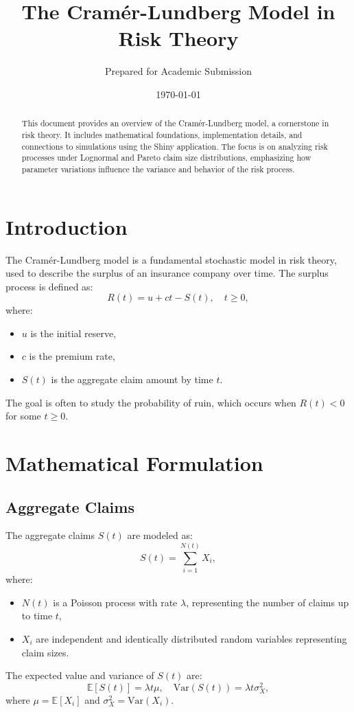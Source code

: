 \documentclass[12pt]{article}
\title{The Cram\'er-Lundberg Model in Risk Theory}
\author{Prepared for Academic Submission}
\date{\today}
\begin{document}
	
	\maketitle
	
	\begin{abstract}
		This document provides an overview of the Cram\'er-Lundberg model, a cornerstone in risk theory. It includes mathematical foundations, implementation details, and connections to simulations using the Shiny application. The focus is on analyzing risk processes under Lognormal and Pareto claim size distributions, emphasizing how parameter variations influence the variance and behavior of the risk process.
	\end{abstract}
	
	\section{Introduction}
	The Cram\'er-Lundberg model is a fundamental stochastic model in risk theory, used to describe the surplus of an insurance company over time. The surplus process is defined as:
	\[
	R(t) = u + ct - S(t), \quad t \geq 0,
	\]
	where:
	\begin{itemize}
		\item $u$ is the initial reserve,
		\item $c$ is the premium rate,
		\item $S(t)$ is the aggregate claim amount by time $t$.
	\end{itemize}
	The goal is often to study the probability of ruin, which occurs when $R(t) < 0$ for some $t \geq 0$.
	
	\section{Mathematical Formulation}
	\subsection{Aggregate Claims}
	The aggregate claims $S(t)$ are modeled as:
	\[
	S(t) = \sum_{i=1}^{N(t)} X_i,
	\]
	where:
	\begin{itemize}
		\item $N(t)$ is a Poisson process with rate $\lambda$, representing the number of claims up to time $t$,
		\item $X_i$ are independent and identically distributed random variables representing claim sizes.
	\end{itemize}
	The expected value and variance of $S(t)$ are:
	\[
	\mathbb{E}[S(t)] = \lambda t \mu, \quad \text{Var}(S(t)) = \lambda t \sigma_X^2,
	\]
	where $\mu = \mathbb{E}[X_i]$ and $\sigma_X^2 = \text{Var}(X_i)$.
	
\end{document}

